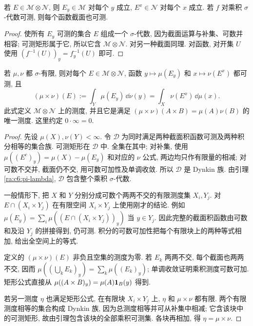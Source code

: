 \begin{proposition}\label{ra:c6:sections}
若 $E\in\mathcal M\otimes\mathcal N$, 则 $E_y\in\mathcal M$ 对每个 $y$ 成立, $E^x\in\mathcal N$ 对每个 $x$ 成立. 若 $f$ 对乘积 $\sigma$-代数可测, 则每个函数截面也可测.
\end{proposition}
\begin{proof}
使所有 $E_y$ 可测的集合 $E$ 组成一个 $\sigma$-代数, 因为截面运算与补集、可数并相容; 可测矩形属于它, 所以它含 $\mathcal M\otimes\mathcal N$. 对另一种截面同理. 对函数, 对开集 $U$ 使用 $(f^{-1}(U))_y=f_y^{-1}(U)$ 即可.
\end{proof}

\begin{theorem}[乘积测度的构造]\label{ra:c6:product}
若 $\mu,\nu$ 都 $\sigma$-有限, 则对每个 $E\in\mathcal M\otimes\mathcal N$, 函数 $y\mapsto\mu(E_y)$ 和 $x\mapsto\nu(E^x)$ 都可测, 且
\[
 (\mu\times\nu)(E):=\int_Y\mu(E_y)\,\dd\nu(y)
 =\int_X\nu(E^x)\,\dd\mu(x).
\]
此式定义 $\mathcal M\otimes\mathcal N$ 上的测度, 并且它是满足
$(\mu\times\nu)(A\times B)=\mu(A)\nu(B)$ 的唯一测度. 这里约定 $0\cdot\infty=0$.
\end{theorem}
\begin{proof}
先设 $\mu(X),\nu(Y)<\infty$. 令 $\mathcal D$ 为同时满足两种截面积函数可测及两种积分相等的集合族. 可测矩形在 $\mathcal D$ 中. 全集在其中; 对补集, 使用 $\mu((E^c)_y)=\mu(X)-\mu(E_y)$ 和对应的 $\nu$ 公式, 两边均只作有限量的相减; 对可数不交并, 截面仍不交, 用可数可加性及单调收敛. 所以 $\mathcal D$ 是 Dynkin 族. 由引理 \ref{ra:c6:pi-lambda}, $\mathcal D$ 包含整个乘积 $\sigma$-代数.

一般情形下, 把 $X$ 和 $Y$ 分别分成可数个两两不交的有限测度集 $X_i,Y_j$. 对 $E\cap(X_i\times Y_j)$ 在有限空间 $X_i\times Y_j$ 上使用刚才的结论. 例如
$\mu(E_y)=\sum_i\mu((E\cap(X_i\times Y_j))_y)$ 当 $y\in Y_j$.
因此完整的截面积函数由可数和及沿 $Y_j$ 的拼接得到, 仍可测. 积分的可数可加性把每个有限块上的两种等式相加, 给出全空间上的等式.

定义的 $(\mu\times\nu)(E)$ 非负且空集的测度为零. 若 $E_k$ 两两不交, 每个截面也两两不交, 因而
$\mu((\bigcup_kE_k)_y)=\sum_k\mu((E_k)_y)$; 单调收敛证明乘积测度可数可加. 矩形公式直接从 $\mu((A\times B)_y)=\mu(A)\mathbf 1_B(y)$ 得到.

若另一测度 $\eta$ 也满足矩形公式, 在有限块 $X_i\times Y_j$ 上, $\eta$ 和 $\mu\times\nu$ 都有限. 两个有限测度相等的集合构成 Dynkin 族, 因为总测度相等并可从补集中相减; 它含该块中的可测矩形, 故由引理包含该块的全部乘积可测集. 各块再相加, 得 $\eta=\mu\times\nu$.
\end{proof}

